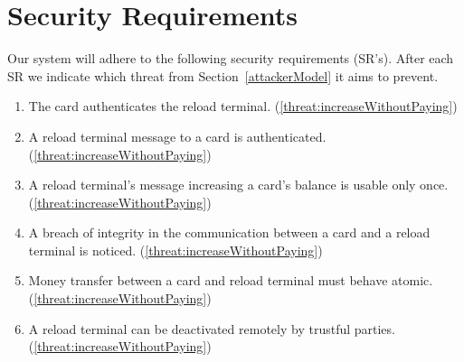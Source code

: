 \section{Security Requirements}
Our system will adhere to the following security requirements (SR's). After each SR we indicate which threat from Section~\ref{attackerModel} it aims to prevent.
\begin{enumerate}[label={SR\arabic*:}, leftmargin=3\parindent]

    \item \label{sr:cardAuthReload}
    The card authenticates the reload terminal. (\ref{threat:increaseWithoutPaying})
    \item \label{sr:reloadCardMessageAuth}
    A reload terminal message to a card is authenticated. (\ref{threat:increaseWithoutPaying})
    \item \label{sr:noReplayLoadingCard}
    A reload terminal's message increasing a card's balance is usable only once. (\ref{threat:increaseWithoutPaying})
    \item \label{sr:cardReloadMessageIntegrity}
    A breach of integrity in the communication between a card and a reload terminal is noticed. (\ref{threat:increaseWithoutPaying})
    \item \label{sr:cardReloadtransterAtomic}
    Money transfer between a card and reload terminal must behave atomic. (\ref{threat:increaseWithoutPaying})
    \item \label{sr:disableReload}
    A reload terminal can be deactivated remotely by trustful parties. (\ref{threat:increaseWithoutPaying})


\end{enumerate}
